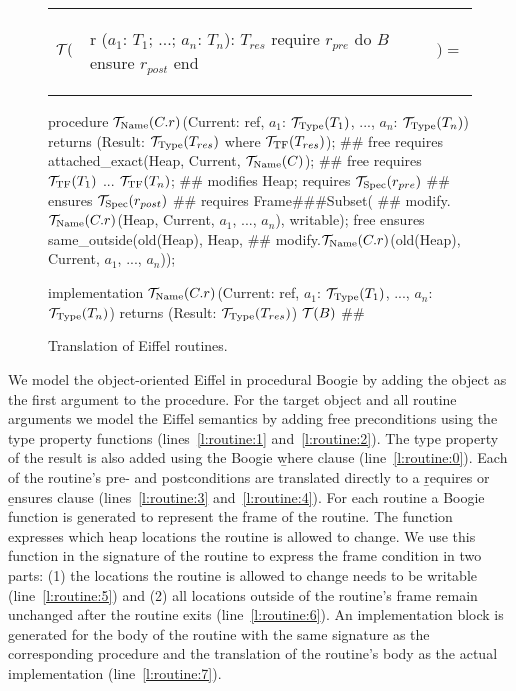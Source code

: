 \begin{figure}[ht]
\centering

\begin{tabular}{lll}
$\mathcal{T}($
&
{\begin{erunning}
r ($a_1$: $T_1$; ...; $a_n$: $T_n$): $T_{res}$
	require $r_{pre}$ do $B$ 
	ensure $r_{post}$ end
\end{erunning}}
&
$)=$
\end{tabular}

\begin{brunning}[numbers=left]
procedure$\ \ts{Name}{C.r}$(Current: ref, $a_1$: $\ts{Type}{T_1}$, ..., $a_n$: $\ts{Type}{T_n}$)
			returns (Result: $\ts{Type}{T_{res}}$ where $\ts{TF}{T_{res}}$); #\label{l:routine:0}#
	free requires attached_exact(Heap, Current,$\ \ts{Name}{C}$); #\label{l:routine:1}#
	free requires $\ts{TF}{T_1}$ ... $\ts{TF}{T_n}$; #\label{l:routine:2}#
	modifies Heap;
	requires $\ts{Spec}{r_{pre}}$ #\label{l:routine:3}#
	ensures $\ts{Spec}{r_{post}}$ #\label{l:routine:4}#
	requires Frame#\##Subset( #\label{l:routine:5}#
				modify.$\ts{Name}{C.r}$(Heap, Current, $a_1$, ..., $a_n$), writable);
	free ensures same_outside(old(Heap), Heap, #\label{l:routine:6}#
				modify.$\ts{Name}{C.r}$(old(Heap), Current, $a_1$, ..., $a_n$));
\end{brunning}
\begin{brunning}[numbers=left,firstnumber=last]
implementation$\ \ts{Name}{C.r}$(Current: ref, $a_1$: $\ts{Type}{T_1}$, ..., 
				$a_n$: $\ts{Type}{T_n}$) returns (Result: $\ts{Type}{T_{res}}$)
{ $\tr{B}$ } #\label{l:routine:7}#
\end{brunning}
\caption{Translation of Eiffel routines.}
\label{fig:translation-routine}
\end{figure}

We model the object-oriented Eiffel in procedural Boogie by adding the  object as the first argument to the procedure. For the target object and all routine arguments we model the Eiffel semantics by adding free preconditions using the type property functions (lines~\ref{l:routine:1} and~\ref{l:routine:2}). The type property of the result is also added using the Boogie \b{where} clause (line~\ref{l:routine:0}).
Each of the routine's pre- and postconditions are translated directly to a \b{requires} or \b{ensures} clause (lines~\ref{l:routine:3} and~\ref{l:routine:4}). For each routine a Boogie function is generated to represent the frame of the routine. The function expresses which heap locations the routine is allowed to change. We use this function in the signature of the routine to express the frame condition in two parts: (1) the locations the routine is allowed to change needs to be writable (line~\ref{l:routine:5}) and (2) all locations outside of the routine's frame remain unchanged after the routine exits (line~\ref{l:routine:6}). An implementation block is generated for the body of the routine with the same signature as the corresponding procedure and the translation of the routine's body as the actual implementation (line~\ref{l:routine:7}).

